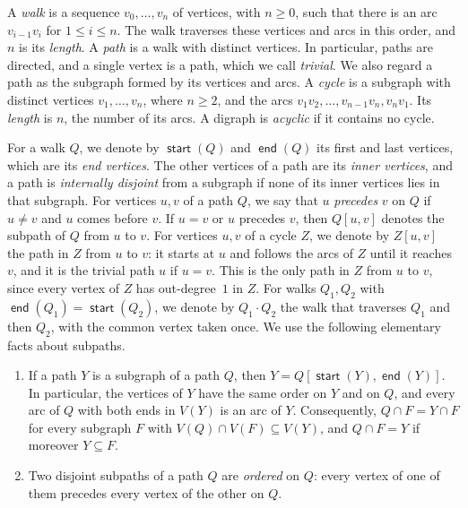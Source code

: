 \documentclass[fontsize=12pt,leading=14pt]{fullpaper}
\DeclareMathOperator{\st}{\mathsf{start}}
\DeclareMathOperator{\en}{\mathsf{end}}
\begin{document}
A \emph{walk} is a sequence $v_0,\dots,v_n$ of vertices, with $n\ge0$, such that there is an arc $v_{i-1}v_i$ for $1\le i\le n$.
The walk traverses these vertices and arcs in this order, and $n$ is its \emph{length}.
A \emph{path} is a walk with distinct vertices.
In particular, paths are directed, and a single vertex is a path, which we call \emph{trivial}.
We also regard a path as the subgraph formed by its vertices and arcs.
A \emph{cycle} is a subgraph with distinct vertices $v_1,\dots,v_n$, where $n\ge2$, and the arcs $v_1v_2,\dots,v_{n-1}v_n,v_nv_1$.
Its \emph{length} is $n$, the number of its arcs.
A digraph is \emph{acyclic} if it contains no cycle.

For a walk $Q$, we denote by $\st(Q)$ and $\en(Q)$ its first and last vertices, which are its \emph{end vertices}.
The other vertices of a path are its \emph{inner vertices}, and a path is \emph{internally disjoint} from a subgraph if none of its inner vertices lies in that subgraph.
For vertices $u,v$ of a path $Q$, we say that $u$ \emph{precedes} $v$ on $Q$ if $u\ne v$ and $u$ comes before $v$.
If $u=v$ or $u$ precedes $v$, then $Q[u,v]$ denotes the subpath of $Q$ from $u$ to $v$.
For vertices $u,v$ of a cycle $Z$, we denote by $Z[u,v]$ the path in $Z$ from $u$ to $v$: it starts at $u$ and follows the arcs of $Z$ until it reaches $v$, and it is the trivial path $u$ if $u=v$.
This is the only path in $Z$ from $u$ to $v$, since every vertex of $Z$ has out-degree~$1$ in $Z$.
For walks $Q_1,Q_2$ with $\en(Q_1)=\st(Q_2)$, we denote by $Q_1\cdot Q_2$ the walk that traverses $Q_1$ and then $Q_2$, with the common vertex taken once.
We use the following elementary facts about subpaths.

\begin{observation}\label{obs:subpath}
  \begin{enumerate}[label=\textnormal{(\roman*)}]
    \item\label{item:subpath-sub} If a path $Y$ is a subgraph of a path $Q$, then $Y=Q[\st(Y),\en(Y)]$.
      In particular, the vertices of $Y$ have the same order on $Y$ and on $Q$, and every arc of $Q$ with both ends in $V(Y)$ is an arc of $Y$.
      Consequently, $Q\cap F=Y\cap F$ for every subgraph $F$ with $V(Q)\cap V(F)\subseteq V(Y)$, and $Q\cap F=Y$ if moreover $Y\subseteq F$.
    \item\label{item:subpath-ordered} Two disjoint subpaths of a path $Q$ are \emph{ordered} on $Q$: every vertex of one of them precedes every vertex of the other on $Q$.
  \end{enumerate}
\end{observation}
\end{document}
